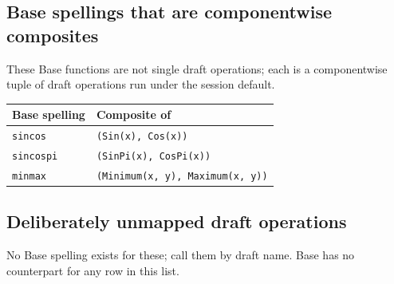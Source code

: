 \subsection{Base spellings that are componentwise composites}



\label{5840106601692650242}{}


These Base functions are not single draft operations; each is a componentwise tuple of draft operations run under the session default.




\begin{table}[h]
\centering
\begin{tabulary}{\linewidth}{L L}
\toprule
Base spelling & Composite of \\
\toprule
\texttt{sincos} & \texttt{(Sin(x), Cos(x))} \\
\texttt{sincospi} & \texttt{(SinPi(x), CosPi(x))} \\
\texttt{minmax} & \texttt{(\allowbreak{}Minimum(\allowbreak{}x, y), Maximum(\allowbreak{}x, y))} \\
\bottomrule
\end{tabulary}

\end{table}



\subsection{Deliberately unmapped draft operations}



\label{14662348581302551618}{}


No Base spelling exists for these; call them by draft name. Base has no counterpart for any row in this list.




